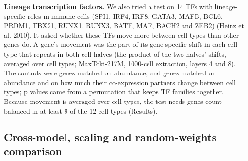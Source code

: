 \documentclass[
  11pt,
]{article}
\begin{document}
\textbf{Lineage transcription factors.} We also tried a test on 14 TFs
with lineage-specific roles in immune cells (SPI1, IRF4, IRF8, GATA3,
MAFB, BCL6, PRDM1, TBX21, RUNX1, RUNX3, BATF, MAF, BACH2 and ZEB2)
(Heinz et al. 2010). It asked whether these TFs move more between cell
types than other genes do. A gene's movement was the part of its
gene-specific shift in each cell type that repeats in both cell halves
(the product of the two halves' shifts, averaged over cell types;
MaxToki-217M, 1000-cell extraction, layers 4 and 8). The controls were
genes matched on abundance, and genes matched on abundance and on how
much their co-expression partners change between cell types; p values
came from a permutation that keeps TF families together. Because
movement is averaged over cell types, the test needs genes
count-balanced in at least 9 of the 12 cell types (Results).

\subsection{Cross-model, scaling and random-weights
comparison}\label{cross-model-scaling-and-random-weights-comparison}
\end{document}
